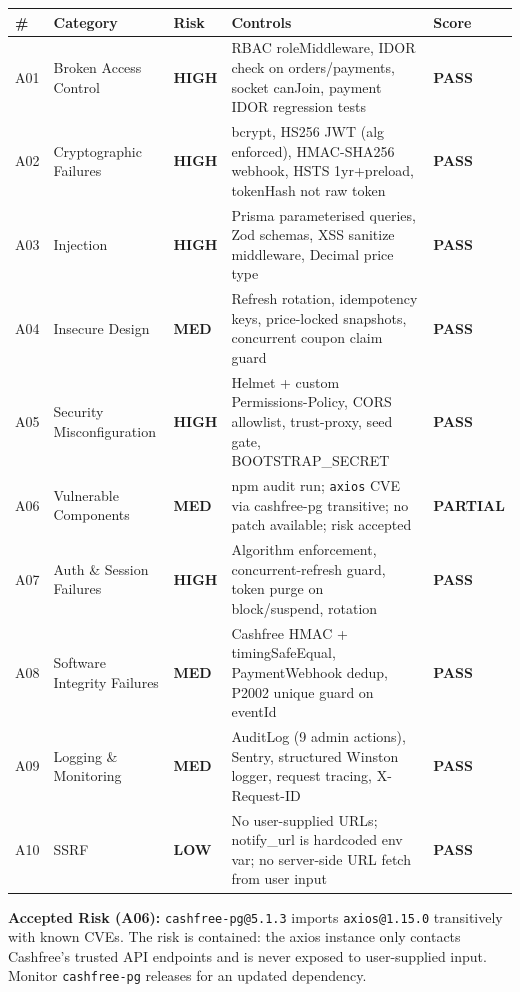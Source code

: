 \documentclass[11pt,a4paper]{article}
\newcommand{\PASS}{\colorbox{successgreen!20}{\color{successgreen}\bfseries\small PASS}}
\newcommand{\PARTIAL}{\colorbox{warnyellow!20}{\color{warnyellow}\bfseries\small PARTIAL}}
\newcommand{\HIGH}{\colorbox{dangerred!18}{\color{dangerred}\bfseries\tiny HIGH}}
\newcommand{\MEDIUM}{\colorbox{warnyellow!18}{\color{warnyellow}\bfseries\tiny MED}}
\newcommand{\LOW}{\colorbox{successgreen!18}{\color{successgreen}\bfseries\tiny LOW}}
\begin{document}
\begin{longtable}{@{}p{0.5cm}p{4cm}p{1.5cm}p{5.5cm}p{1.5cm}@{}}
\toprule
\rowcolor{navyblue}
\color{white}\bfseries\# & \color{white}\bfseries Category & \color{white}\bfseries Risk & \color{white}\bfseries Controls & \color{white}\bfseries Score \\
\midrule
\endfirsthead\midrule\endhead\bottomrule\endfoot
A01 & Broken Access Control & \HIGH & RBAC roleMiddleware, IDOR check on orders/payments, socket canJoin, payment IDOR regression tests & \PASS \\
\rowcolor{rowalt}
A02 & Cryptographic Failures & \HIGH & bcrypt, HS256 JWT (alg enforced), HMAC-SHA256 webhook, HSTS 1yr+preload, tokenHash not raw token & \PASS \\
A03 & Injection & \HIGH & Prisma parameterised queries, Zod schemas, XSS sanitize middleware, Decimal price type & \PASS \\
\rowcolor{rowalt}
A04 & Insecure Design & \MEDIUM & Refresh rotation, idempotency keys, price-locked snapshots, concurrent coupon claim guard & \PASS \\
A05 & Security Misconfiguration & \HIGH & Helmet + custom Permissions-Policy, CORS allowlist, trust-proxy, seed gate, BOOTSTRAP\_SECRET & \PASS \\
\rowcolor{rowalt}
A06 & Vulnerable Components & \MEDIUM & npm audit run; \texttt{axios} CVE via cashfree-pg transitive; no patch available; risk accepted & \PARTIAL \\
A07 & Auth \& Session Failures & \HIGH & Algorithm enforcement, concurrent-refresh guard, token purge on block/suspend, rotation & \PASS \\
\rowcolor{rowalt}
A08 & Software Integrity Failures & \MEDIUM & Cashfree HMAC + timingSafeEqual, PaymentWebhook dedup, P2002 unique guard on eventId & \PASS \\
A09 & Logging \& Monitoring & \MEDIUM & AuditLog (9 admin actions), Sentry, structured Winston logger, request tracing, X-Request-ID & \PASS \\
\rowcolor{rowalt}
A10 & SSRF & \LOW & No user-supplied URLs; notify\_url is hardcoded env var; no server-side URL fetch from user input & \PASS \\
\end{longtable}

\vspace{6pt}

\begin{warnbox}
\textbf{Accepted Risk (A06):} \texttt{cashfree-pg@5.1.3} imports \texttt{axios@1.15.0}
transitively with known CVEs. The risk is contained: the axios instance only contacts
Cashfree's trusted API endpoints and is never exposed to user-supplied input.
Monitor \texttt{cashfree-pg} releases for an updated dependency.
\end{warnbox}
\end{document}
